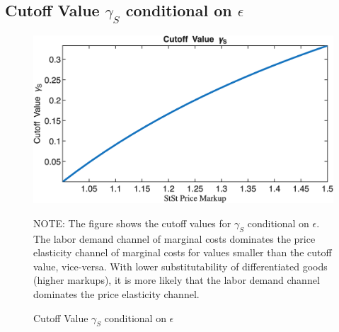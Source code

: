 \documentclass[12pt,3p,authoryear,review]{elsarticle}
\begin{document}
\subsection{Cutoff Value $\gamma_S$ conditional on $\epsilon$}\label{sec:cutoff_gammaES}%
\begin{figure}[h!]%
	\centering%
	\caption{Cutoff Value $\gamma_S$ conditional on $\epsilon$}%
	\includegraphics{fig_8_stst_gamES_cutoff.png}\\%
	{\tiny \singlespacing NOTE: The figure shows the cutoff values for $\gamma_S$ conditional on $\epsilon$. The labor demand channel of marginal costs dominates the price elasticity channel of marginal costs for values smaller than the cutoff value, vice-versa. With lower substitutability of differentiated goods (higher markups), it is more likely that the labor demand channel dominates the price elasticity channel. \par}%
\end{figure}%
\FloatBarrier%
\end{document}
